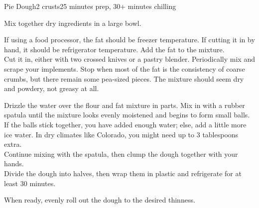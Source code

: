 \documentclass[../Cookbook.tex]{subfiles}
\begin{document}
\begin{recipe}[PieCrust]{Pie Dough}{2 crusts}{25 minutes prep, 30+ minutes chilling}

Mix together dry ingredients in a large bowl.

If using a food processor, the fat should be freezer temperature. If cutting it in by hand, it should be refrigerator temperature.
Add the fat to the mixture.\\
Cut it in, either with two crossed knives or a pastry blender. Periodically mix and scrape your implements.
Stop when most of the fat is the consistency of coarse crumbs, but there remain some pea-sized pieces.
The mixture should seem dry and powdery, not greasy at all.

Drizzle the water over the flour and fat mixture in parts. Mix in with a rubber spatula until the mixture looks evenly moistened and begins to form small balls.
If the balls stick together, you have added enough water; else, add a little more ice water. In dry climates like Colorado, you might need up to 3 tablespoons extra.\\
Continue mixing with the spatula, then clump the dough together with your hands.\\
Divide the dough into halves, then wrap them in plastic and refrigerate for at least 30 minutes.

\newstep
When ready, evenly roll out the dough to the desired thinness.

\end{recipe}
\end{document}
